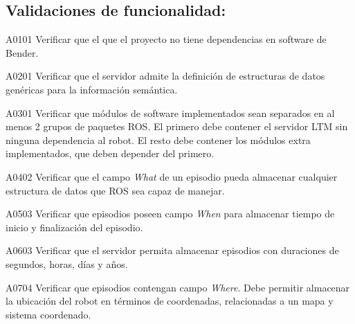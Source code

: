 \newenvironment{def-validacion}[3]
{
	\noindent{\bfseries Validación \Vlabel{#1}{#2}}
	\hfill\textit{(Derivado de }\RSlabel{#3})\\
}{}

\subsection{Validaciones de funcionalidad: }

\begin{def-validacion}{A}{01}{01}
	Verificar que el que el proyecto no tiene dependencias en software de Bender.
\end{def-validacion}

\begin{def-validacion}{A}{02}{01}
	Verificar que el servidor admite la definición de estructuras de datos genéricas para la información semántica.	
\end{def-validacion}

\begin{def-validacion}{A}{03}{01}
	Verificar que módulos de software implementados sean separados en al menos 2 grupos de paquetes ROS. El primero debe contener el servidor LTM sin ninguna dependencia al robot. El resto debe contener los módulos extra implementados, que deben depender del primero.	
\end{def-validacion}

\begin{def-validacion}{A}{04}{02}
Verificar que el campo \textit{What} de un episodio pueda almacenar cualquier estructura de datos que ROS sea capaz de manejar.	
\end{def-validacion}

\begin{def-validacion}{A}{05}{03}
Verificar que episodios poseen campo \textit{When} para almacenar tiempo de inicio y finalización del episodio.	
\end{def-validacion}

\begin{def-validacion}{A}{06}{03}
	Verificar que el servidor permita almacenar episodios con duraciones de segundos, horas, días y años.	
\end{def-validacion}

\begin{def-validacion}{A}{07}{04}
	Verificar que episodios contengan campo \textit{Where}. Debe permitir almacenar la ubicación del robot en términos de coordenadas, relacionadas a un mapa y sistema coordenado.
\end{def-validacion}

